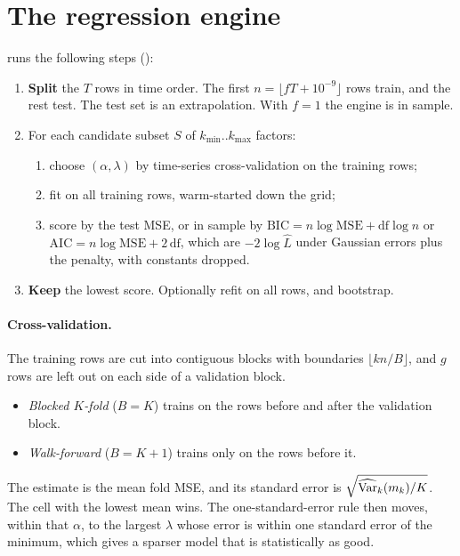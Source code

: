 \section{The regression engine}
 runs the following steps ():
\begin{enumerate}
  \item \textbf{Split} the $T$ rows in time order. The first
        $n=\lfloor fT+10^{-9}\rfloor$ rows train, and the rest test. The test set is an
        extrapolation. With $f=1$ the engine is in sample.
  \item For each candidate subset $S$ of $k_{\min}..k_{\max}$ factors:
        \begin{enumerate}
          \item choose $(\alpha,\lambda)$ by time-series cross-validation on the training
                rows;
          \item fit on all training rows, warm-started down the grid;
          \item score by the test MSE, or in sample by
                $\mathrm{BIC}=n\log\mathrm{MSE}+\mathrm{df}\log n$ or
                $\mathrm{AIC}=n\log\mathrm{MSE}+2\,\mathrm{df}$, which are $-2\log\hat L$
                under Gaussian errors plus the penalty, with constants dropped.
        \end{enumerate}
  \item \textbf{Keep} the lowest score. Optionally refit on all rows, and bootstrap.
\end{enumerate}

\paragraph{Cross-validation.} The training rows are cut into contiguous blocks with
boundaries $\lfloor kn/B\rfloor$, and $g$ rows are left out on each side of a validation
block.
\begin{itemize}
  \item \emph{Blocked $K$-fold} ($B=K$) trains on the rows before and after the validation
        block.
  \item \emph{Walk-forward} ($B=K+1$) trains only on the rows before it.
\end{itemize}
The estimate is the mean fold MSE, and its standard error is
$\sqrt{\widehat{\operatorname{Var}}_k(m_k)/K}$. The cell with the lowest mean wins. The one-standard-error
rule then moves, within that $\alpha$, to the largest $\lambda$ whose error is within one
standard error of the minimum, which gives a sparser model that is statistically as good.

